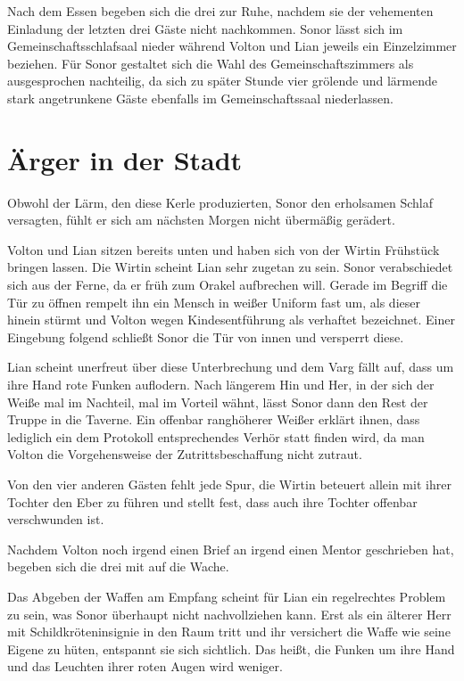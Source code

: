 \documentclass[a4paper]{scrreprt}
\begin{document}
Nach dem Essen begeben sich die drei zur Ruhe, nachdem sie der vehementen Einladung der letzten drei Gäste nicht nachkommen.
Sonor lässt sich im Gemeinschaftsschlafsaal nieder während Volton und Lian jeweils ein Einzelzimmer beziehen.
Für Sonor gestaltet sich die Wahl des Gemeinschaftszimmers als ausgesprochen nachteilig, da sich zu später Stunde vier grölende und lärmende stark angetrunkene Gäste ebenfalls im Gemeinschaftssaal niederlassen.

\section{Ärger in der Stadt}

Obwohl der Lärm, den diese Kerle produzierten, Sonor den erholsamen Schlaf versagten, fühlt er sich am nächsten Morgen nicht übermäßig gerädert.

Volton und Lian sitzen bereits unten und haben sich von der Wirtin Frühstück bringen lassen. Die Wirtin scheint Lian sehr zugetan zu sein. Sonor verabschiedet sich aus der Ferne, da er früh zum Orakel aufbrechen will. Gerade im Begriff die Tür zu öffnen rempelt ihn ein Mensch in weißer Uniform fast um, als dieser hinein stürmt und Volton wegen Kindesentführung als verhaftet bezeichnet.
Einer Eingebung folgend schließt Sonor die Tür von innen und versperrt diese.

Lian scheint unerfreut über diese Unterbrechung und dem Varg fällt auf, dass um ihre Hand rote Funken auflodern.
Nach längerem Hin und Her, in der sich der Weiße mal im Nachteil, mal im Vorteil wähnt, lässt Sonor dann den Rest der Truppe in die Taverne.
Ein offenbar ranghöherer Weißer erklärt ihnen, dass lediglich ein dem Protokoll entsprechendes Verhör statt finden wird, da man Volton die Vorgehensweise der Zutrittsbeschaffung nicht zutraut.

Von den vier anderen Gästen fehlt jede Spur, die Wirtin beteuert allein mit ihrer Tochter den Eber zu führen und stellt fest, dass auch ihre Tochter offenbar verschwunden ist.

Nachdem Volton noch irgend einen Brief an irgend einen Mentor geschrieben hat, begeben sich die drei mit auf die Wache.

Das Abgeben der Waffen am Empfang scheint für Lian ein regelrechtes Problem zu sein, was Sonor überhaupt nicht nachvollziehen kann. Erst als ein älterer Herr mit Schildkröteninsignie in den Raum tritt und ihr versichert die Waffe wie seine Eigene zu hüten, entspannt sie sich sichtlich. Das heißt, die Funken um ihre Hand und das Leuchten ihrer roten Augen wird weniger.
\end{document}
